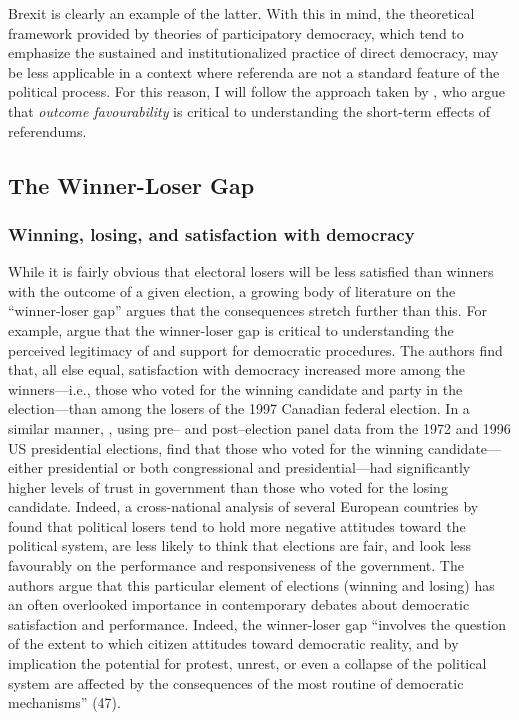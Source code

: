 \documentclass[12pt, letter]{article}
\begin{document}
Brexit is clearly an example of the latter. With this in mind, the theoretical framework provided by theories of participatory democracy, which tend to emphasize the sustained and institutionalized practice of direct democracy, may be less applicable in a context where referenda are not a standard feature of the political process. For this reason, I will follow the approach taken by \textcite{marien2017winner}, who argue that \textit{outcome favourability} is critical to understanding the short-term effects of referendums. 


\subsection{The Winner-Loser Gap}

\subsubsection{Winning, losing, and satisfaction with democracy}
While it is fairly obvious that electoral losers will be less satisfied than winners with the outcome of a given election, a growing body of literature on the ``winner-loser gap'' argues that the consequences stretch further than this. For example, \textcite{blais2007winning} argue that the winner-loser gap is critical to understanding the perceived legitimacy of and support for democratic procedures. The authors find that, all else equal, satisfaction with democracy increased more among the winners---i.e., those who voted for the winning candidate and party in the election---than among the losers of the 1997 Canadian federal election. In a similar manner, \textcite{anderson2002winning}, using pre-- and post--election panel data from the 1972 and 1996 US presidential elections, find that those who voted for the winning candidate---either presidential or both congressional and presidential---had significantly higher levels of trust in government than those who voted for the losing candidate. Indeed, a cross-national analysis of several European countries by \textcite{anderson2005losers} found that political losers tend to hold more negative attitudes toward the political system, are less likely to think that elections are fair, and look less favourably on the performance and responsiveness of the government. The authors argue that this particular element of elections (winning and losing) has an often overlooked importance in contemporary debates about democratic satisfaction and performance. Indeed, the winner-loser gap ``involves the question of the extent to which citizen attitudes toward democratic reality, and by implication the potential for protest, unrest, or even a collapse of the political system are affected by the consequences of the most routine of democratic mechanisms'' (47). 
\end{document}
